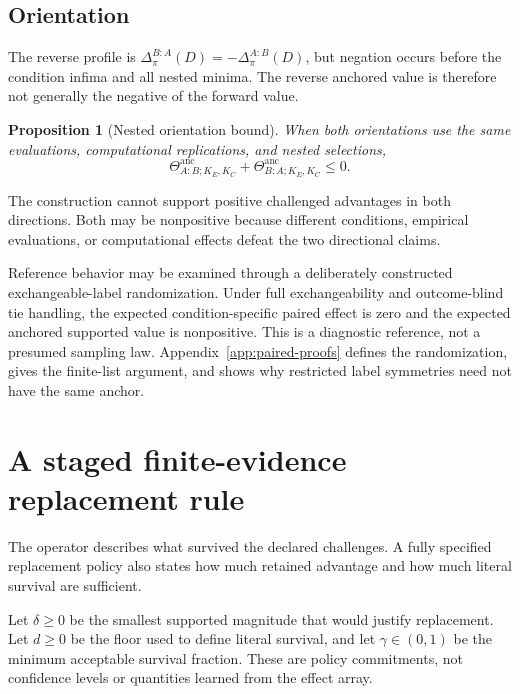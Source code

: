 \documentclass[11pt]{article}
\newcommand{\Thetaanc}{\Theta^{\mathrm{anc}}}
\newtheorem{proposition}{Proposition}
\theoremstyle{remark}
\begin{document}
\subsection{Orientation}

The reverse profile is
$\Delta^{B:A}_\pi(D)=-\Delta^{A:B}_\pi(D)$, but negation occurs before the
condition infima and all nested minima. The reverse anchored value is therefore
not generally the negative of the forward value.

\begin{proposition}[Nested orientation bound]
\label{prop:orientation}
When both orientations use the same evaluations, computational replications,
and nested selections,
\begin{equation}
\Thetaanc_{A:B;K_E,K_C}
+
\Thetaanc_{B:A;K_E,K_C}
\leq0.
\label{eq:orientation}
\end{equation}
\end{proposition}
The construction cannot support positive challenged advantages in both
directions. Both may be nonpositive because different conditions, empirical
evaluations, or computational effects defeat the two directional claims.

Reference behavior may be examined through a deliberately constructed
exchangeable-label randomization. Under full exchangeability and outcome-blind
tie handling, the expected condition-specific paired effect is zero and the
expected anchored supported value is nonpositive. This is a diagnostic
reference, not a presumed sampling law. Appendix~\ref{app:paired-proofs}
defines the randomization, gives the finite-list argument, and shows why
restricted label symmetries need not have the same anchor.

\section{A staged finite-evidence replacement rule}
\label{sec:decision}

The operator describes what survived the declared challenges. A fully
specified replacement policy also states how much retained advantage and how
much literal survival are sufficient.

Let $\delta\geq0$ be the smallest supported magnitude that would justify
replacement. Let $d\geq0$ be the floor used to define literal survival, and
let $\gamma\in(0,1)$ be the minimum acceptable survival fraction. These are
policy commitments, not confidence levels or quantities learned from the
effect array.
\end{document}
